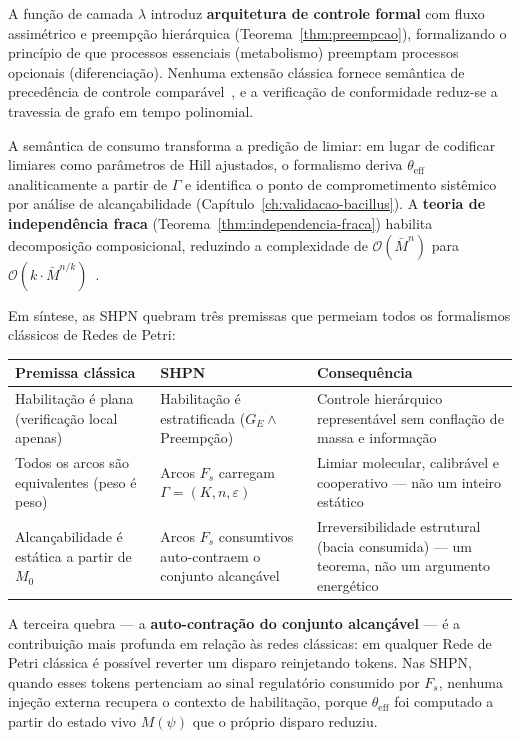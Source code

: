 A função de camada $\lambda$ introduz \textbf{arquitetura de controle formal}
com fluxo assimétrico e preempção hierárquica
(Teorema~\ref{thm:preempcao}), formalizando o princípio de que processos
essenciais (metabolismo) preemptam processos opcionais (diferenciação).
Nenhuma extensão clássica fornece semântica de precedência de controle
comparável~\cite{Simao2025HierarchicalPreemption}, e a verificação de conformidade reduz-se a travessia de grafo
em tempo polinomial.

A semântica de consumo transforma a predição de limiar: em lugar de codificar
limiares como parâmetros de Hill ajustados, o formalismo deriva
$\theta_{\text{eff}}$ analiticamente a partir de $\Gamma$ e identifica o ponto
de comprometimento sistêmico por análise de alcançabilidade
(Capítulo~\ref{ch:validacao-bacillus}).
A \textbf{teoria de independência fraca}
(Teorema~\ref{thm:independencia-fraca}) habilita decomposição composicional,
reduzindo a complexidade de $\mathcal{O}(\bar{M}^n)$ para
$\mathcal{O}(k \cdot \bar{M}^{n/k})$~\cite{Simao2025WeakIndependence,Simao2026QuorumSensing}.

Em síntese, as SHPN quebram três premissas que permeiam todos os formalismos
clássicos de Redes de Petri:

\begin{center}\small
\begin{tabular}{@{}p{3.8cm}p{3.8cm}p{4.5cm}@{}}
\toprule
Premissa clássica & SHPN & Consequência \\
\midrule
Habilitação é plana (verificação local apenas) &
  Habilitação é estratificada ($G_E \wedge$ Preempção) &
  Controle hierárquico representável sem conflação de massa e informação \\
\addlinespace
Todos os arcos são equivalentes (peso é peso) &
  Arcos $F_s$ carregam $\Gamma=(K,n,\varepsilon)$ &
  Limiar molecular, calibrável e cooperativo --- não um inteiro estático \\
\addlinespace
Alcançabilidade é estática a partir de $M_0$ &
  Arcos $F_s$ consumtivos auto-contraem o conjunto alcançável &
  Irreversibilidade estrutural (bacia consumida) --- um teorema, não um
  argumento energético \\
\bottomrule
\end{tabular}
\end{center}

A terceira quebra --- a \textbf{auto-contração do conjunto alcançável} --- é a
contribuição mais profunda em relação às redes clássicas: em qualquer Rede de
Petri clássica é possível reverter um disparo reinjetando tokens.  Nas SHPN,
quando esses tokens pertenciam ao sinal regulatório consumido por $F_s$,
nenhuma injeção externa recupera o contexto de habilitação, porque
$\theta_\text{eff}$ foi computado a partir do estado vivo $M(\psi)$ que o
próprio disparo reduziu.

